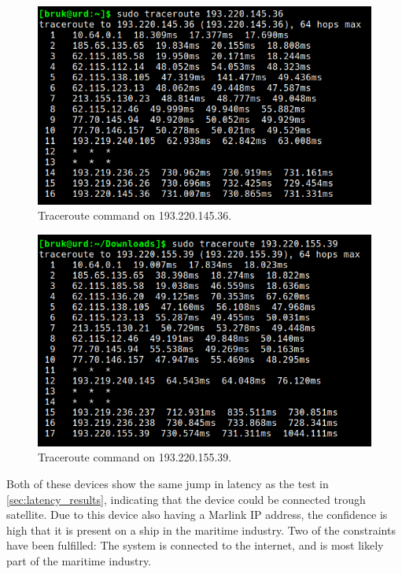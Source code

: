 \begin{figure} [H]
    \centering
    \includegraphics[scale=0.4]{Figurer/marlink_161_2.png}
    \caption{Traceroute command on 193.220.145.36.}
    \label{fig:marlink_traceroute_2}
\end{figure}

\begin{figure} [H]
    \centering
    \includegraphics[scale=0.4]{Figurer/marlink_161_1.png}
    \caption{Traceroute command on 193.220.155.39.}
    \label{fig:marlink_traceroute_1}
\end{figure}

Both of these devices show the same jump in latency as the test in \cref{sec:latency_results}, indicating that the device could be connected trough satellite. Due to this device also having a Marlink IP address, the confidence is high that it is present on a ship in the maritime industry. Two of the constraints have been fulfilled: The system is connected to the internet, and is most likely part of the maritime industry. 

